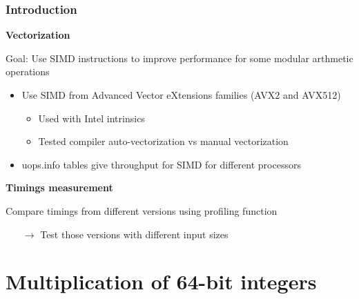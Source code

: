 \documentclass[10pt]{beamer}
\begin{document}
\begin{frame}
\begin{center}
{
        }
    \end{center}
\end{frame}

\begin{frame}
    \frametitle{Introduction}

    \textbf{Vectorization}
    
    Goal: Use SIMD instructions to improve performance for some modular arthmetic operations

    \begin{itemize}
        \item Use SIMD from Advanced Vector eXtensions families (AVX2 and AVX512)
            \begin{itemize}
                \item Used with Intel intrinsics
                \item Tested compiler auto-vectorization vs manual vectorization
            \end{itemize}
        \item uops.info tables give throughput for SIMD for different processors
    \end{itemize}
    
    \bigskip
    \textbf{Timings measurement}

    Compare timings from different versions using profiling function
    \begin{itemize}
        \item[$\rightarrow$] Test those versions with different input sizes
    \end{itemize}
\end{frame}

\section{Multiplication of 64-bit integers}
\end{document}
